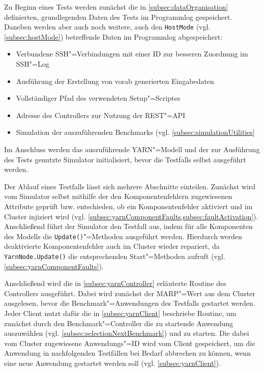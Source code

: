 Zu Beginn eines \glspl{Test} werden zunächst die in \cref{subsec:dataOrganisation} definierten, grundlegenden Daten des \glspl{Test} im Programmlog gespeichert.
Daneben werden aber auch noch weitere, auch den \texttt{HostMode} (vgl. \cref{subsec:hostMode}) betreffende Daten im Programmlog abgespeichert:

\begin{itemize}
    \item Verbundene SSH"=Verbindungen mit einer ID zur besseren Zuordnung im SSH"=Log
    \item Ausführung der Erstellung von vorab generierten Eingabedaten
    \item Vollständiger Pfad des verwendeten Setup"=Scriptes
    \item Adresse des Controllers zur Nutzung der \gls{REST}"=API
    \item Simulation der auszuführenden Benchmarks (vgl. \cref{subsec:simulationUtilities}
\end{itemize}

Im Anschluss werden das auszuführende \gls{YARN}"=Modell und der zur Ausführung des \glspl{Test} genutzte Simulator initialisiert, bevor die \glspl{Testfall} selbst ausgeführt werden.

Der Ablauf eines Testfalls lässt sich mehrere Abschnitte einteilen.
Zunächst wird vom Simulator selbst mithilfe der den Komponentenfehlern zugewiesenen Attribute geprüft bzw. entschieden, ob ein Komponentenfehler aktiviert und im Cluster injiziert wird (vgl. \cref{subsec:yarnComponentFaults,subsec:faultActivation}).
Anschließend führt der Simulator den Testfall aus, indem für alle Komponenten des Modells die \texttt{Update()}"=Methoden ausgeführt werden.
Hierdurch werden deaktivierte Komponentenfehler auch im Cluster wieder repariert, da \texttt{YarnNode.Update()} die entsprechenden Start"=Methoden aufruft (vgl. \cref{subsec:yarnComponentFaults}).

Anschließend wird die in \cref{subsec:yarnController} erläuterte Routine des Controllers ausgeführt.
Dabei wird zunächst der \gls{MARP}"=Wert aus dem Cluster ausgelesen, bevor die Benchmark"=Anwendungen des Testfalls gestartet werden.
Jeder Client nutzt dafür die in \cref{subsec:yarnClient} beschriebe Routine, um zunächst durch den Benchmark"=Controller die zu startende \gls{Anwendung} auszuwählen (vgl. \cref{subsec:selectionNextBenchmark}) und zu starten.
Die dabei vom Cluster zugewiesene Anwendungs"=ID wird vom Client gespeichert, um die \gls{Anwendung} in nachfolgenden Testfällen bei Bedarf abbrechen zu können, wenn eine neue \gls{Anwendung} gestartet werden soll (vgl. \cref{subsec:yarnClient}).

